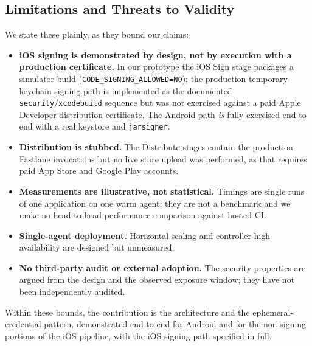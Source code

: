 \documentclass[conference]{IEEEtran}
\begin{document}
\subsection{Limitations and Threats to Validity}\label{sec:limits}
We state these plainly, as they bound our claims:
\begin{itemize}
  \item \textbf{iOS signing is demonstrated by design, not by execution with a
  production certificate.} In our prototype the iOS Sign stage packages a
  simulator build (\texttt{CODE\_SIGNING\_ALLOWED=NO}); the production
  temporary-keychain signing path is implemented as the documented
  \texttt{security}/\texttt{xcodebuild} sequence but was not exercised against a
  paid Apple Developer distribution certificate. The Android path \emph{is}
  fully exercised end to end with a real keystore and \texttt{jarsigner}.
  \item \textbf{Distribution is stubbed.} The Distribute stages contain the
  production Fastlane invocations but no live store upload was performed, as that
  requires paid App Store and Google Play accounts.
  \item \textbf{Measurements are illustrative, not statistical.} Timings are
  single runs of one application on one warm agent; they are not a benchmark and
  we make no head-to-head performance comparison against hosted CI.
  \item \textbf{Single-agent deployment.} Horizontal scaling and controller
  high-availability are designed but unmeasured.
  \item \textbf{No third-party audit or external adoption.} The security
  properties are argued from the design and the observed exposure window; they
  have not been independently audited.
\end{itemize}
Within these bounds, the contribution is the architecture and the
ephemeral-credential pattern, demonstrated end to end for Android and for the
non-signing portions of the iOS pipeline, with the iOS signing path specified in
full.

\end{document}
